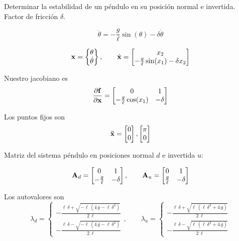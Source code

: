 \documentclass[11pt, a4paper, twoside, openright, openany]{book}
\begin{document}
\begin{exercise}
Determinar la estabilidad de un péndulo en su posición normal e invertida. Factor de fricción $\delta$.

\[
\ddot{\theta} = -\frac{g}{\ell} \sin(\theta) - \delta \dot{\theta}
\]

\[
\mathbf{x} = \begin{Bmatrix}
\theta \\ \dot{\theta}
\end{Bmatrix}, \qquad \dot{\mathbf{x}} = \begin{bmatrix}
x_2 \\
-\frac{g}{\ell}\sin(x_1)-\delta x_2
\end{bmatrix}
\]

Nuestro jacobiano es
\[
\frac{\partial {\mathbf{f}}}{\partial {\mathbf{x}}} = \begin{bmatrix}
0 & 1 \\
-\frac{g}{\ell} \cos(x_1) & -\delta 
\end{bmatrix}
\]

Los puntos fijos son 
\[
\mathbf{\bar{x}} = \begin{bmatrix}
0\\0
\end{bmatrix},
\begin{bmatrix}
\pi\\0
\end{bmatrix}
\]

Matriz del sistema péndulo en posiciones normal $d$ e invertida $u$:

\[
\mathbf{A}_d = \begin{bmatrix}
0 & 1 \\
-\frac{g}{\ell} & -\delta
\end{bmatrix},\qquad
\mathbf{A}_u = \begin{bmatrix}
0 & 1 \\
\frac{g}{\ell} & -\delta
\end{bmatrix}
\]

Los autovalores son
\[
\lambda_{d}=\begin{cases}
-\frac{\ell \,\delta +\sqrt{-\ell\,\left(4\,g-\ell\,{\delta }^2\right)}}{2\,\ell} \\
-\frac{\ell\,\delta -\sqrt{-\ell\,\left(4\,g-\ell\,\delta ^2\right)}}{2\,\ell} 
\end{cases}, \qquad \lambda_u = \begin{cases}
-\frac{\ell\,\delta +\sqrt{\ell\,\left(\ell\,\delta ^2+4\,g\right)}}{2\,\ell } \\
-\frac{\ell\,\delta -\sqrt{\ell\,\left(\ell\,{\delta }^2+4\,g\right)}}{2\,\ell}
\end{cases}
\]


\end{exercise}
\end{document}
